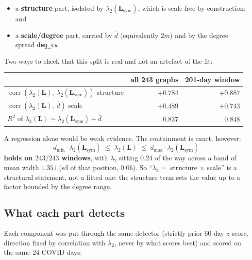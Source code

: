 \documentclass[11pt,a4paper]{article}
\newcommand{\Lap}{\mathbf{L}}
\newcommand{\Lsym}{\Lap_{\mathrm{sym}}}
\begin{document}
\begin{itemize}
\item a \textbf{structure} part, isolated by $\lambda_2(\Lsym)$, which is scale-free
by construction; and
\item a \textbf{scale/degree} part, carried by $\bar d$ (equivalently $2m$) and by
the degree spread \texttt{deg\_cv}.
\end{itemize}

Two ways to check that this split is real and not an artefact of the fit:

\begin{center}\small
\renewcommand{\arraystretch}{1.15}
\begin{tabular}{@{}lrr@{}}
\toprule
& \textbf{all 243 graphs} & \textbf{201-day window} \\
\midrule
$\operatorname{corr}(\lambda_2(\Lap),\ \lambda_2(\Lsym))$ \quad\small structure &
$+0.784$ & $+0.887$ \\
$\operatorname{corr}(\lambda_2(\Lap),\ \bar d)$ \quad\small scale &
$+0.489$ & $+0.743$ \\
$R^2$ of $\lambda_2(\Lap) \sim \lambda_2(\Lsym) + \bar d$ & $0.837$ & $0.848$ \\
\bottomrule
\end{tabular}
\end{center}

A regression alone would be weak evidence. The containment is exact, however:
\[
d_{\min}\cdot\lambda_2(\Lsym) \;\le\; \lambda_2(\Lap) \;\le\; d_{\max}\cdot\lambda_2(\Lsym)
\]
\textbf{holds on $243/243$ windows}, with $\lambda_2$ sitting $0.24$ of the way
across a band of mean width $1.351$ (sd of that position, $0.06$). So
``$\lambda_2 = $ structure $\times$ scale'' is a structural statement, not a fitted
one: the structure term sets the value up to a factor bounded by the degree range.

\subsection*{What each part detects}

Each component was put through the same detector (strictly-prior 60-day $z$-score,
direction fixed by correlation with $\lambda_2$, never by what scores best) and
scored on the same 24 COVID days:
\end{document}
